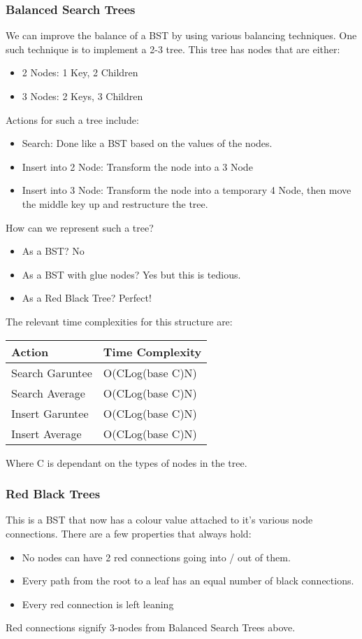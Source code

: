 \documentclass[11pt]{article}
\begin{document}
\subsubsection*{Balanced Search Trees}
\label{sec:orgb87c72e}
We can improve the balance of a BST by using various balancing techniques.
One such technique is to implement a 2-3 tree.
This tree has nodes that are either:
\begin{itemize}
\item 2 Nodes: 1 Key, 2 Children
\item 3 Nodes: 2 Keys, 3 Children
\end{itemize}

Actions for such a tree include:
\begin{itemize}
\item Search: Done like a BST based on the values of the nodes.
\item Insert into 2 Node: Transform the node into a 3 Node
\item Insert into 3 Node: Transform the node into a temporary 4 Node, then move the middle key up and restructure the tree.
\end{itemize}

How can we represent such a tree?
\begin{itemize}
\item As a BST? No
\item As a BST with glue nodes? Yes but this is tedious.
\item As a Red Black Tree? Perfect!
\end{itemize}

The relevant time complexities for this structure are:
\begin{center}
\begin{tabular}{ll}
Action & Time Complexity\\
\hline
Search Garuntee & O(CLog(base C)N)\\
Search Average & O(CLog(base C)N)\\
Insert Garuntee & O(CLog(base C)N)\\
Insert Average & O(CLog(base C)N)\\
\end{tabular}
\end{center}
Where C is dependant on the types of nodes in the tree.

\subsubsection*{Red Black Trees}
\label{sec:org66b0bed}
This is a BST that now has a colour value attached to it's various node connections.
There are a few properties that always hold:
\begin{itemize}
\item No nodes can have 2 red connections going into / out of them.
\item Every path from the root to a leaf has an equal number of black connections.
\item Every red connection is left leaning
\end{itemize}
Red connections signify 3-nodes from Balanced Search Trees above.
\end{document}
